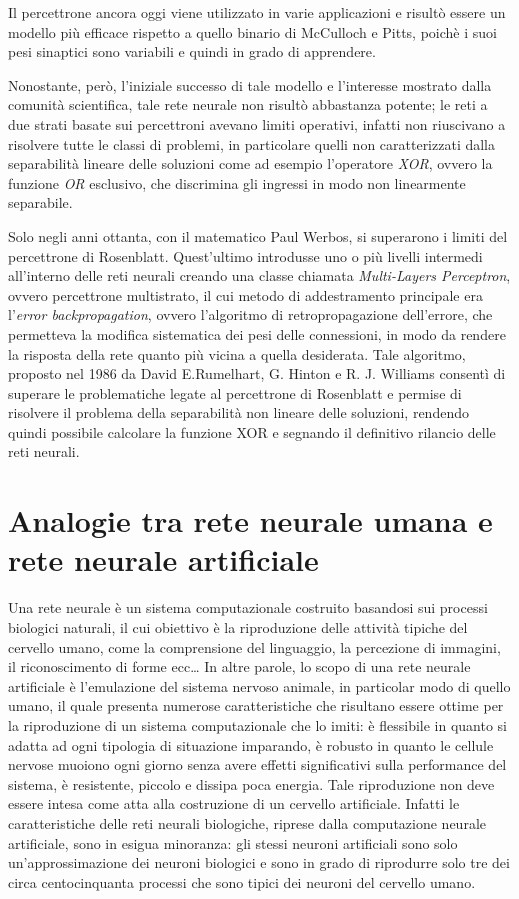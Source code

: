 \documentclass[12pt,a4paper,oneside]{book}
\begin{document}
		Il percettrone ancora oggi viene utilizzato in varie applicazioni e risultò essere un modello più efficace rispetto a quello binario di McCulloch e Pitts, poichè i suoi pesi sinaptici sono variabili e quindi in grado di apprendere.
		
		Nonostante, però, l'iniziale successo di tale modello e l'interesse mostrato dalla comunità scientifica, tale rete neurale non risultò abbastanza potente; le reti a due strati basate sui percettroni avevano limiti operativi, infatti non riuscivano a risolvere tutte le classi di problemi, in particolare quelli non caratterizzati dalla separabilità lineare delle soluzioni come ad esempio l'operatore \emph{XOR}, ovvero la funzione \emph{OR} esclusivo, che discrimina gli ingressi in modo non linearmente separabile.
		
		Solo negli anni ottanta, con il matematico Paul Werbos, si superarono i limiti del percettrone di Rosenblatt.  Quest'ultimo introdusse uno o più livelli intermedi all'interno delle reti neurali creando una classe chiamata  \emph{Multi-Layers Perceptron}, ovvero percettrone multistrato, il cui metodo di addestramento principale era l'\emph{error backpropagation}, ovvero l'algoritmo di retropropagazione dell'errore, che permetteva la modifica sistematica dei pesi delle connessioni, in modo da rendere la risposta della rete quanto più vicina a quella desiderata.
		Tale algoritmo, proposto nel 1986 da David E.Rumelhart, G. Hinton e R. J. Williams consentì di superare le problematiche legate al percettrone di Rosenblatt e permise di risolvere il problema della separabilità non lineare delle soluzioni, rendendo quindi possibile calcolare la funzione XOR e segnando il definitivo rilancio delle reti neurali.
		
		
		\section{Analogie tra rete neurale umana e rete neurale artificiale}
	
		Una rete neurale è un sistema computazionale costruito basandosi sui processi biologici naturali, il cui obiettivo è la riproduzione delle attività tipiche del cervello umano, come la comprensione del linguaggio, la percezione di immagini, il riconoscimento di forme ecc\dots 
		In altre parole, lo scopo di una rete neurale artificiale è l’emulazione del sistema nervoso animale, in particolar modo di quello umano, il quale presenta numerose caratteristiche che risultano essere ottime per la riproduzione di un sistema computazionale che lo imiti: è flessibile in quanto si adatta ad ogni tipologia di situazione imparando, è robusto in quanto le cellule nervose muoiono ogni giorno senza avere effetti significativi sulla performance del sistema, è resistente, piccolo e dissipa poca energia. 
		Tale riproduzione non deve essere intesa come atta alla costruzione di un cervello artificiale. Infatti le caratteristiche delle reti neurali biologiche, riprese dalla computazione neurale artificiale, sono in esigua minoranza: gli stessi neuroni artificiali sono solo un’approssimazione dei neuroni biologici e sono in grado di riprodurre solo tre dei circa centocinquanta processi che sono tipici dei neuroni del cervello umano. 
	
\end{document}
